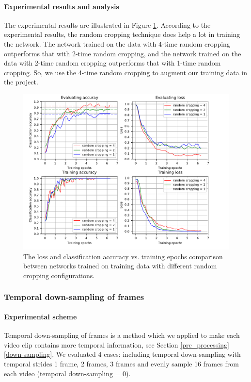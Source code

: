 \paragraph{Experimental results and analysis}
The experimental results are illustrated in Figure \ref{fig:plot_rc}. According to the experimental results, the random cropping technique does help a lot in training the network. The network trained on the data with 4-time random cropping outperforms that with 2-time random cropping, and the network trained on the data with 2-time random cropping outperforms that with 1-time random cropping. So, we use the 4-time random cropping to augment our training data in the project.
\begin{figure}
	\includegraphics[trim=0cm 0cm 0cm 0cm]{fig01/plot_rc.pdf}
	\caption{The loss and classification accuracy vs. training epochs comparison between networks trained on training data with different random cropping configurations.}
	\label{fig:plot_rc}
\end{figure}


\subsubsection{Temporal down-sampling of frames}
\paragraph{Experimental scheme}
Temporal down-sampling of frames is a method which we applied to make each video clip contains more temporal information, see Section \ref{pre_processing} \ref{down-sampling}. We evaluated 4 cases: including temporal down-sampling with temporal strides 1 frame, 2 frames, 3 frames and evenly sample 16 frames from each video (temporal down-sampling = 0).  

